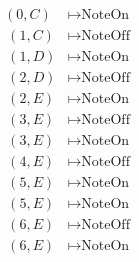 \documentclass[preview]{standalone}
\begin{document}
\begin{align*}
(0,C) & \mapsto \text{NoteOn} \\ \
        (1,C) & \mapsto \text{NoteOff} \\ \
        (1,D) & \mapsto \text{NoteOn} \\ \
        (2,D) & \mapsto \text{NoteOff} \\ \
        (2,E) & \mapsto \text{NoteOn} \\ \
        (3,E) & \mapsto \text{NoteOff} \\ \
        (3,E) & \mapsto \text{NoteOn} \\ \
        (4,E) & \mapsto \text{NoteOff} \\ \
        (5,E) & \mapsto \text{NoteOn} \\ \
        (5,E) & \mapsto \text{NoteOn} \\ \
        (6,E) & \mapsto \text{NoteOff} \\ \
        (6,E) & \mapsto \text{NoteOn} \\
\end{align*}
\end{document}
